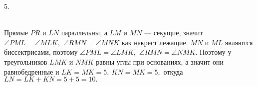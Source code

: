 5. \begin{figure}[ht!]
\end{figure}\\
Прямые $PR$ и $LN$ параллельны, а $LM$ и $MN$ --- секущие, значит $\angle PML = \angle MLK,$  $\angle RMN= \angle MNK$ как накрест лежащие. $MN$ и $ML$ являются биссектрисами, поэтому $\angle PML = \angle LMK,$ $ \angle RMN= \angle NMK.$ Поэтому у треугольников $LMK$ и $NMK$ равны углы при основаниях, а значит они равнобедренные и $LK=MK=5,\ KN=MK=5,$ откуда $LN=LK+KN=5+5=10.$\\
